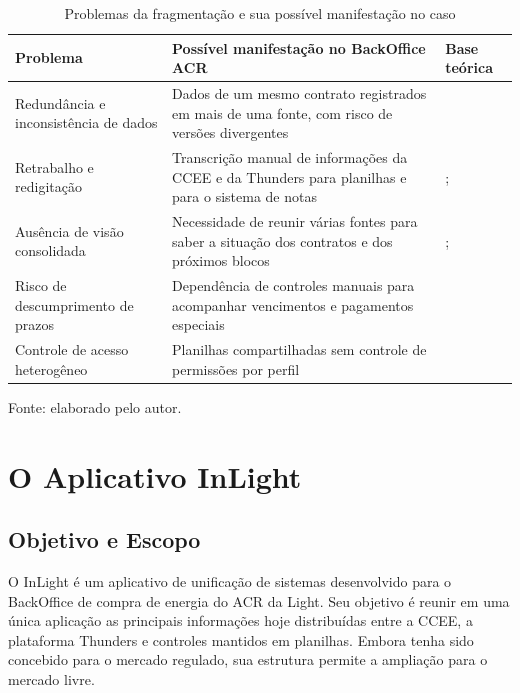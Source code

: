 \begin{table}[H]
\centering
\caption{Problemas da fragmentação e sua possível manifestação no caso}
\label{tab:problemas}
\footnotesize
\begin{tabularx}{\textwidth}{P{3.2cm}XP{3.2cm}}
\toprule
\textbf{Problema} & \textbf{Possível manifestação no BackOffice ACR} & \textbf{Base teórica} \\ \midrule
Redundância e inconsistência de dados & Dados de um mesmo contrato registrados em mais de uma fonte, com risco de versões divergentes & \citet{elmasri2016} \\ \midrule
Retrabalho e redigitação & Transcrição manual de informações da CCEE e da Thunders para planilhas e para o sistema de notas & \citet{stair2018}; \citet{hammer1990} \\ \midrule
Ausência de visão consolidada & Necessidade de reunir várias fontes para saber a situação dos contratos e dos próximos blocos & \citet{power2002}; \citet{sharda2014} \\ \midrule
Risco de descumprimento de prazos & Dependência de controles manuais para acompanhar vencimentos e pagamentos especiais & \citet{brasil2004decreto} \\ \midrule
Controle de acesso heterogêneo & Planilhas compartilhadas sem controle de permissões por perfil & \citet{whitman2018} \\ \bottomrule
\end{tabularx}

\vspace{0.2cm}
{\footnotesize Fonte: elaborado pelo autor.}
\end{table}

\section{O Aplicativo InLight}
\label{sec:inlight}

\subsection{Objetivo e Escopo}

O InLight é um aplicativo de unificação de sistemas desenvolvido para o BackOffice de compra de energia do ACR da Light. Seu objetivo é reunir em uma única aplicação as principais informações hoje distribuídas entre a CCEE, a plataforma Thunders e controles mantidos em planilhas. Embora tenha sido concebido para o mercado regulado, sua estrutura permite a ampliação para o mercado livre.

